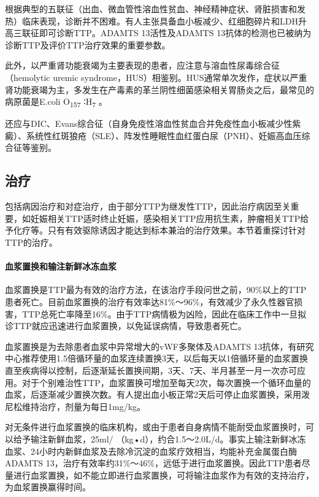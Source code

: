 根据典型的五联征（出血、微血管性溶血性贫血、神经精神症状、肾脏损害和发热）临床表现，诊断并不困难。有人主张具备血小板减少、红细胞碎片和LDH升高三联征即可诊断TTP。ADAMTS
13活性及ADAMTS
13抗体的检测也已被纳为诊断TTP及评价TTP治疗效果的重要参数。

此外，以严重肾功能衰竭为主要表现的患者，应注意与溶血性尿毒综合征（hemolytic
uremic
syndrome，HUS）相鉴别。HUS通常单次发作，症状以严重肾功能衰竭为主，多发生在产毒素的革兰阴性细菌感染相关胃肠炎之后，最常见的病原菌是E.coli
O\textsubscript{157} ∶H\textsubscript{7} 。

还应与DIC、Evans综合征（自身免疫性溶血性贫血合并免疫性血小板减少性紫癜）、系统性红斑狼疮（SLE）、阵发性睡眠性血红蛋白尿（PNH）、妊娠高血压综合征等鉴别。

\subsection{治疗}

包括病因治疗和对症治疗，由于部分TTP为继发性TTP，因此治疗病因至关重要，如妊娠相关TTP适时终止妊娠，感染相关TTP应用抗生素，肿瘤相关TTP给予化疗等。只有有效驱除诱因才能达到标本兼治的治疗效果。本节着重探讨针对TTP的治疗。

\paragraph{血浆置换和输注新鲜冰冻血浆}

血浆置换是TTP最为有效的治疗方法，在该治疗手段问世之前，90\%以上的TTP患者死亡。目前血浆置换的治疗有效率达81\%～96\%，有效减少了永久性器官损害，TTP总死亡率降至16\%。由于TTP病情极为凶险，因此在临床工作中一旦拟诊TTP就应迅速进行血浆置换，以免延误病情，导致患者死亡。

血浆置换是为去除患者血浆中异常增大的vWF多聚体及ADAMTS
13抗体，有研究中心推荐使用1.5倍循环量的血浆连续置换3天，以后每天以1倍循环量的血浆置换直至疾病得以控制，后逐渐延长置换间期，3天、7天、半月甚至一月一次亦可应用。对于个别难治性TTP，血浆置换可增加至每天2次，每次置换一个循环血量的血浆，后逐渐减少置换次数。有人提出血小板正常2天后可停止血浆置换，采用泼尼松维持治疗，剂量为每日1mg/kg。

对无条件进行血浆置换的临床机构，或由于患者自身病情不能耐受血浆置换时，可以给予输注新鲜血浆，25ml/
（kg•d），约合1.5～2.0L/d。事实上输注新鲜冰冻血浆、24小时内新鲜血浆及去除冷沉淀的血浆疗效相当，均能补充金属蛋白酶ADAMTS
13，治疗有效率约31\%～46\%，远低于进行血浆置换。因此TTP患者尽量进行血浆置换，如不能立即进行血浆置换，可将输注血浆作为有效的支持治疗，为血浆置换赢得时间。

